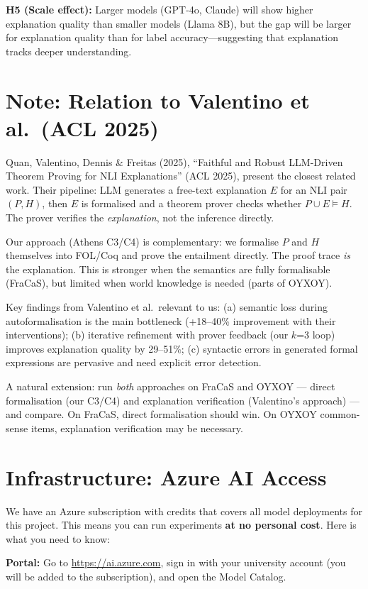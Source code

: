 \documentclass[11pt,a4paper]{article}
\begin{document}
\textbf{H5 (Scale effect):} Larger models (GPT-4o, Claude) will show higher explanation quality than smaller models (Llama 8B), but the gap will be larger for explanation quality than for label accuracy---suggesting that explanation tracks deeper understanding.

\section{Note: Relation to Valentino et al.\ (ACL 2025)}

Quan, Valentino, Dennis \& Freitas (2025), ``Faithful and Robust LLM-Driven Theorem Proving for NLI Explanations'' (ACL 2025), present the closest related work. Their pipeline: LLM generates a free-text explanation $E$ for an NLI pair $(P, H)$, then $E$ is formalised and a theorem prover checks whether $P \cup E \models H$. The prover verifies the \emph{explanation}, not the inference directly.

Our approach (Athens C3/C4) is complementary: we formalise $P$ and $H$ themselves into FOL/Coq and prove the entailment directly. The proof trace \emph{is} the explanation. This is stronger when the semantics are fully formalisable (FraCaS), but limited when world knowledge is needed (parts of OYXOY).

Key findings from Valentino et al.\ relevant to us: (a) semantic loss during autoformalisation is the main bottleneck (+18--40\% improvement with their interventions); (b) iterative refinement with prover feedback (our $k$=3 loop) improves explanation quality by 29--51\%; (c) syntactic errors in generated formal expressions are pervasive and need explicit error detection.

A natural extension: run \emph{both} approaches on FraCaS and OYXOY --- direct formalisation (our C3/C4) and explanation verification (Valentino's approach) --- and compare. On FraCaS, direct formalisation should win. On OYXOY common-sense items, explanation verification may be necessary.

\section{Infrastructure: Azure AI Access}

We have an Azure subscription with credits that covers all model deployments for this project. This means you can run experiments \textbf{at no personal cost}. Here is what you need to know:

\textbf{Portal:} Go to \url{https://ai.azure.com}, sign in with your university account (you will be added to the subscription), and open the Model Catalog.
\end{document}
